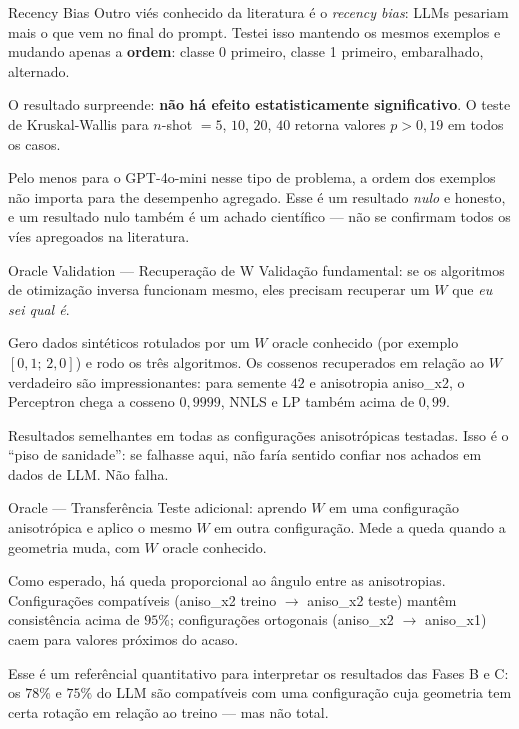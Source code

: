 \documentclass[aspectratio=169,10pt]{beamer}
\begin{document}
\begin{frame}{Recency Bias}
  \small
  Outro vi\'es conhecido da literatura \'e o \emph{recency bias}: LLMs pesariam mais o que vem no final
  do prompt. Testei isso mantendo os mesmos exemplos e mudando apenas a \textbf{ordem}: classe 0 primeiro,
  classe 1 primeiro, embaralhado, alternado.
  \medskip

  O resultado surpreende: \textbf{n\~ao h\'a efeito estatisticamente significativo}. O teste de
  Kruskal-Wallis para $n$-shot $=5$, $10$, $20$, $40$ retorna valores $p > 0{,}19$ em todos os casos.
  \medskip

  Pelo menos para o GPT-4o-mini nesse tipo de problema, a ordem dos exemplos n\~ao importa para the
  desempenho agregado. Esse \'e um resultado \emph{nulo} e honesto, e um resultado nulo tamb\'em \'e
  um achado cient\'ifico --- n\~ao se confirmam todos os v\'ies apregoados na literatura.
\end{frame}

\begin{frame}{Oracle Validation --- Recupera\c{c}\~ao de W}
  \small
  Valida\c{c}\~ao fundamental: se os algoritmos de otimiza\c{c}\~ao inversa funcionam mesmo, eles
  precisam recuperar um $W$ que \emph{eu sei qual \'e}.
  \medskip

  Gero dados sint\'eticos rotulados por um $W$ oracle conhecido (por exemplo $[0{,}1;\,2{,}0]$) e rodo
  os tr\^es algoritmos. Os cossenos recuperados em rela\c{c}\~ao ao $W$ verdadeiro s\~ao impressionantes:
  para semente $42$ e anisotropia aniso\_x2, o Perceptron chega a cosseno \textbf{$0{,}9999$}, NNLS e LP
  tamb\'em acima de $0{,}99$.
  \medskip

  Resultados semelhantes em todas as configura\c{c}\~oes anisotr\'opicas testadas. Isso \'e o ``piso de
  sanidade'': se falhasse aqui, n\~ao far\'ia sentido confiar nos achados em dados de LLM. N\~ao falha.
\end{frame}

\begin{frame}{Oracle --- Transfer\^encia}
  \small
  Teste adicional: aprendo $W$ em uma configura\c{c}\~ao anisotr\'opica e aplico o mesmo $W$ em outra
  configura\c{c}\~ao. Mede a queda quando a geometria muda, com $W$ oracle conhecido.
  \medskip

  Como esperado, h\'a queda proporcional ao \^angulo entre as anisotropias. Configura\c{c}\~oes
  compat\'iveis (aniso\_x2 treino $\to$ aniso\_x2 teste) mant\^em consist\^encia acima de $95\%$;
  configura\c{c}\~oes ortogonais (aniso\_x2 $\to$ aniso\_x1) caem para valores pr\'oximos do acaso.
  \medskip

  Esse \'e um refer\^encial quantitativo para interpretar os resultados das Fases B e C: os $78\%$ e
  $75\%$ do LLM s\~ao compat\'iveis com uma configura\c{c}\~ao cuja geometria tem certa rota\c{c}\~ao em
  rela\c{c}\~ao ao treino --- mas n\~ao total.
\end{frame}
\end{document}
